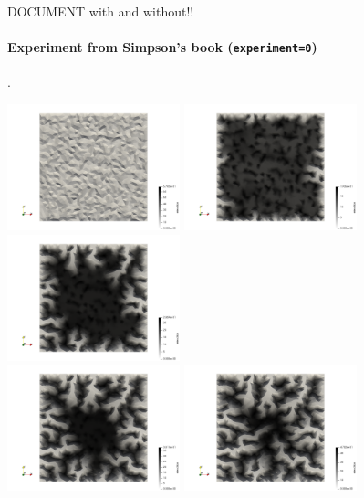 DOCUMENT with and without!! 



\paragraph{Experiment from Simpson's book ({\tt experiment=0})}.

\begin{center}
\includegraphics[width=5cm]{python_codes/fieldstone_140/results/exp0/z_000}
\includegraphics[width=5cm]{python_codes/fieldstone_140/results/exp0/z_100}
\includegraphics[width=5cm]{python_codes/fieldstone_140/results/exp0/z_200}\\
\includegraphics[width=5cm]{python_codes/fieldstone_140/results/exp0/z_300}
\includegraphics[width=5cm]{python_codes/fieldstone_140/results/exp0/z_400}

\end{center}
